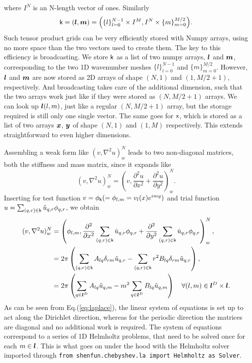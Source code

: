 \documentclass[%
oneside,                 %
final,                   %
10pt]{article}
\theoremstyle{definition}
\begin{document}
where $I^N$ is an N-length vector of ones. Similarly
\begin{equation}
\boldsymbol{\textsf{k}} = (\boldsymbol{l}, \boldsymbol{m}) = \Big(\{ l \}_{l=0}^{N-1} \times I^M,  I^N \times \{ m \}_{m=0}^{M/2} \Big). 
\end{equation}
Such tensor product grids can be very efficiently stored with Numpy arrays, using no more space than the two vectors used to create them. The key to this efficiency is broadcasting. We store $\boldsymbol{\textsf{k}}$ as a list of two numpy arrays, $\boldsymbol{l}$ and $\boldsymbol{m}$, corresponding to the two 1D wavenumber meshes $\{ l \}_{l=0}^{N-1}$ and $\{ m \}_{m=0}^{M/2}$. 
However, $\boldsymbol{l}$ and $\boldsymbol{m}$ are now stored as 2D arrays of shape $(N, 1)$ and $(1, M/2+1)$, respectively. And broadcasting takes care of the additional dimension, such that the two arrays work just like if they were stored as $(N, M/2+1)$ arrays. We can look up $\boldsymbol{l}(l, m)$, just like a regular $(N, M/2+1)$ array, but the storage required is still only one single vector. 
The same goes for $\boldsymbol{\textsf{x}}$, which is stored as a list of two arrays $\boldsymbol{x}$, $\boldsymbol{y}$ of shape $(N, 1)$ and $(1, M)$ respectively. This extends straightforward to even higher dimensions. 

Assembling a weak form like $(v, \nabla^2 u)_w^N$ leads to two non-diagonal matrices, both the stiffness and mass matrix, since it expands like
\begin{equation}
(v, \nabla^2 u)_w^N = \left(v, \frac{\partial^2 u}{\partial x^2} + \frac{\partial^2 u}{\partial y^2} \right)_w^N.
\end{equation}
Inserting for test function $v = \phi_{\boldsymbol{\textsf{k}}} (= \phi_{l, m} =v_l(x) e^{imy})$ and trial function $u = \sum_{(q,r)\in \boldsymbol{\textsf{k}}} \hat{u}_{q, r} \phi_{q,r}$, we obtain
\begin{align}
 (v, \nabla^2 u)_w^N &= \left(\phi_{l, m}, \frac{\partial^2}{\partial x^2} \sum_{(q, r) \in \boldsymbol{\textsf{k}}} \hat{u}_{q, r} \phi_{q, r} + \frac{\partial^2}{\partial y^2} \sum_{(q,r) \in \boldsymbol{\textsf{k}}} \hat{u}_{q, r} \phi_{q, r} \right)_w^N, \\ 
 &= 2\pi \left(\sum_{(q, r) \in \boldsymbol{\textsf{k}}} A_{lq} \delta_{rm} \hat{u}_{q,r} -  \sum_{(q, r) \in \boldsymbol{\textsf{k}}} {r}^2  B_{lq} \delta_{rm} \hat{u}_{q,r}\right), \\ 
 &= 2\pi \left(\sum_{q\in \boldsymbol{l}^D} A_{lq} \hat{u}_{q,m} - {m}^2 \sum_{q\in \boldsymbol{l}^D}  B_{lq} \hat{u}_{q,m}\right) \quad \forall (l, m) \in \boldsymbol{l}^D \times \boldsymbol{l}. \label{eq:laplace}
\end{align}
As can be seen from Eq.(\ref{eq:laplace}), the linear system of equations is set up to act along the Dirichlet direction, whereas for the periodic direction the matrices are diagonal and no additional work is required. The system of equations correspond to a series of 1D Helmholtz problems, that need to be solved once for each $m \in \boldsymbol{l}$. This is what goes on under the hood with the Helmholtz solver imported through \texttt{from shenfun.chebyshev.la import Helmholtz as Solver}.
\end{document}
